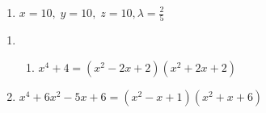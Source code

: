 \begin{enumerate}
\setcounter{enumi}{\value{HW}}

\item $x = 10, \; y = 10, \; z = 10, \lambda = \frac{2}{5}$

\setcounter{HW}{\value{enumi}}
\end{enumerate}

\begin{enumerate}
\setcounter{enumi}{\value{HW}}

\item \begin{enumerate} 

\addtocounter{enumii}{2}

\item $x^{4} + 4 = (x^{2} - 2x + 2)(x^{2} + 2x + 2)$

\end{enumerate}

\item $x^{4} + 6x^{2} - 5x + 6 = (x^{2} - x + 1)(x^{2} + x + 6)$

\end{enumerate}

\closegraphsfile